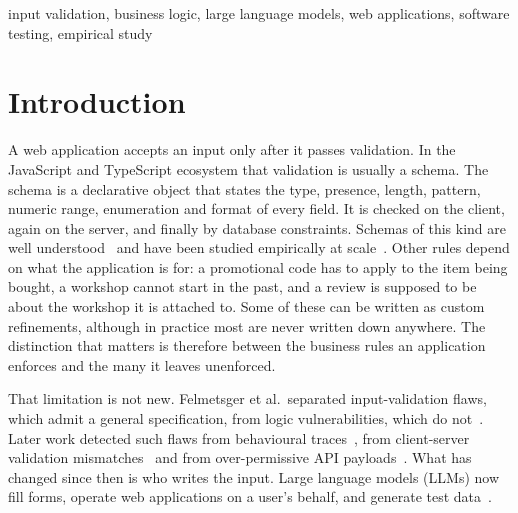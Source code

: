 \documentclass[conference]{IEEEtran}
\begin{document}
\begin{IEEEkeywords}
input validation, business logic, large language models, web applications, software testing,
empirical study
\end{IEEEkeywords}

\section{Introduction}

A web application accepts an input only after it passes validation. In the JavaScript and TypeScript
ecosystem that validation is usually a schema. The schema is a declarative object that states the type,
presence, length, pattern, numeric range, enumeration and format of every field. It is checked on the
client, again on the server, and finally by database constraints. Schemas of this kind are well
understood~\cite{pezoa2016foundations,attouche2023jsonschema} and have been studied empirically at
scale~\cite{baazizi2021usagenot}. Other rules depend on what the application is for: a promotional code has to apply to the item being
bought, a workshop cannot start in the past, and a review is supposed to be about the workshop it is
attached to. Some of these can be written as custom refinements, although in practice most are never
written down anywhere. The distinction that matters is therefore between the business rules an
application enforces and the many it leaves unenforced.

That limitation is not new. Felmetsger et al.\ separated input-validation flaws, which admit a general
specification, from logic vulnerabilities, which do not~\cite{felmetsger2010waler}. Later work detected
such flaws from behavioural traces~\cite{pellegrino2014logicflaws}, from client-server validation
mismatches~\cite{bisht2010notamper} and from over-permissive API
payloads~\cite{corradini2023massassignment}. What has changed since then is who writes the input. Large
language models (LLMs) now fill forms, operate web applications on a user's behalf, and generate test
data~\cite{li2026webformtest,alian2024formnexus,li2025formfactory}.
\end{document}
